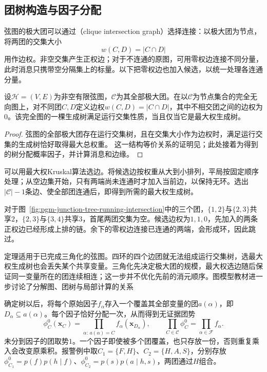 \subsection{团树构造与因子分配}
\label{sec:pgm-junction-tree-spanning-tree}

弦图的极大团可以通过（clique intersection graph）选择连接：以极大团为节点，将两团的交集大小
\[
  w(C,D)=|C\cap D|
\]
用作边权。非空交集产生正权边；对于不连通的原图，可用零权边连接不同分量，此时消息只携带空分隔集上的标量。以下把零权边也加入候选，以统一处理各连通分量。

\begin{theorem}[最大权生成树与团树]
  \label{thm:pgm-junction-tree-maximum-weight}
  设$\mathcal{H}=(V,E)$为非空有限弦图，$\mathcal{C}$为其全部极大团。在以$\mathcal{C}$为节点集合的完全无向图上，对不同团$C,D$定义边权$w(C,D)=|C\cap D|$，其中不相交团之间的边权为$0$。该完全图的一棵生成树满足运行交集性质，当且仅当它是最大权生成树。
\end{theorem}

\begin{proof}
  弦图的全部极大团存在运行交集树，且在交集大小作为边权时，满足运行交集的生成树恰好取得最大总权重。
  这一结构等价关系的证明见；此处接着为得到的树分配概率因子，并计算消息和边缘。
\end{proof}

可以用最大权Kruskal算法选边。将候选边按权重从大到小排列，平局按固定顺序处理；从空边集开始，只有两端尚未连通时才加入当前边，以保持无环。选出$|\mathcal C|-1$条边、使全部团连通后，即得到所需的最大权生成树。

对于图~\ref{fig:pgm-junction-tree-running-intersection}中的三个团，$\{1,2\}$与$\{2,3\}$共享$2$，$\{2,3\}$与$\{3,4\}$共享$3$，首尾两团交集为空。候选边权为$1,1,0$，先加入的两条正权边已经形成上排的链。余下的零权边连接已连通的两端，会形成环，因此跳过。

定理适用于已完成三角化的弦图。四环的四个边团就无法组成运行交集树，选最大权生成树也会丢失某个共享变量。三角化先决定极大团的规模，最大权选边随后保证同一变量所在的团连续相连；这一步并不优化先前的消元顺序。图模型教材进一步讨论了分解图、团树与局部计算的关系

确定树以后，将每个原始因子$f_\alpha$存入一个覆盖其全部变量的团$a(\alpha)$，即$D_\alpha\subseteq a(\alpha)$。每个因子恰好分配一次，从而得到无证据团势
\begin{equation}
  \phi_C^0(\bm{x}_C)
    =\prod_{\alpha:\,a(\alpha)=C}f_\alpha(\bm{x}_{D_\alpha}),
  \qquad
  \prod_{C\in\mathcal{C}}\phi_C^0
    =\prod_{\alpha\in\mathcal{F}}f_\alpha.
  \label{eq:pgm-junction-tree-factor-assignment}
\end{equation}
未分到因子的团取势$1$。一个因子即使被多个团覆盖，也只存放一份，否则重复乘入会改变原乘积。报警例中取$C_1=\{F,H\}$、$C_2=\{H,A,S\}$，分别存放$\phi_{C_1}^0=p(f)p(h\mid f)$、$\phi_{C_2}^0=p(s)p(a\mid h,s)$，两团通过$H$组合。

